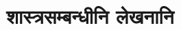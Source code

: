 \documentclass[12pt,twoside,openany]{book}
\begin{document}
\def\@part[#1]#2{%
    \ifnum \c@secnumdepth >-2\relax
      \refstepcounter{part}%
      \addcontentsline{toc}{part}{\thepart\hspace{1em}#1}%
    \else
      \addcontentsline{toc}{part}{#1}%
    \fi
    \markboth{}{}%
    {\centering
     \interlinepenalty \@M
     \normalfont
     \ifnum \c@secnumdepth >-2\relax
       {\selectlanguage{english}\englishfont\huge\bfseries \partname\nobreakspace\thepart}
       \par
       \vskip 20\p@
     \fi
     \devanagarifont\Huge\bfseries #2\par}%
    \@endpart}

\makeatother

\part{शास्त्रसम्बन्धीनि लेखनानि}


\end{document}
